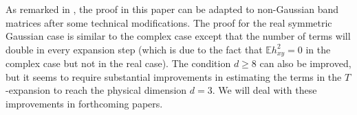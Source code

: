 \documentclass{article}
\makeatletter
\newcommand{\1}{\mathds{1}}
\numberwithin{equation}{section}
\newcommand{\be}{\begin{equation}}
\newcommand{\ee}{\end{equation}}
\newcommand{\e}{{\varepsilon}}
\newcommand{\ii}{\mathrm{i}} %
\renewcommand{\geq}{\geqslant}
\renewcommand{\ge}{\geq}
\newcommand{\E}{\mathbb{E}}
\newcommand{\C}{\mathbb{C}}
\newcommand{\Z}{\mathbb{Z}}
\DeclareMathOperator{\re}{Re}
\DeclareMathOperator{\im}{Im}
\DeclareMathOperator{\OO}{O}
\theoremstyle{plain} %
\newtheorem{theorem}{Theorem}[section]
\theoremstyle{remark}
\newcommand{\cor}{\color{red}}
\renewcommand{\subsection}{\@startsection
	{subsection}%
	{2}%
	{0mm}%
	{-\baselineskip}%
	{0.5\baselineskip}%
	{\normalfont\bf\itshape}} %
\newcommand{\hty}[1]{{\cor (ht: #1) }}
\makeatother
\begin{document}
%
% 




As remarked in \cite{PartI_high}, the proof in this paper can be adapted to non-Gaussian band matrices after some technical modifications. 
The proof for the real symmetric Gaussian case is similar to the complex case except that the number of terms will double in every expansion step (which is due to the fact that $\E h_{xy}^2 = 0$ in the complex case but not in the real case). 
The condition $d\ge 8$ can also be improved, but it seems to require substantial improvements in estimating the terms in the $T$-expansion to reach the physical dimension $d=3$. We will deal with these improvements in forthcoming papers.

\end{document}
